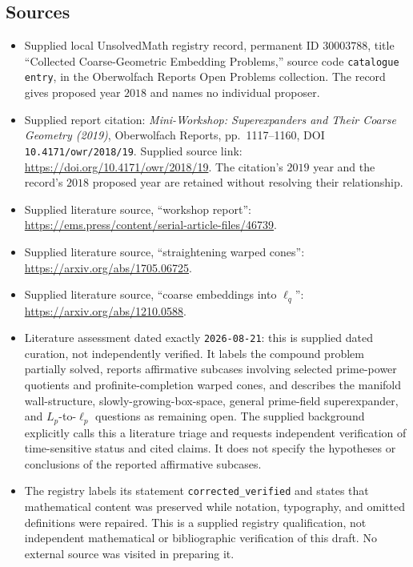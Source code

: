 \documentclass[11pt]{article}
\begin{document}
\subsection{Sources}
\begin{itemize}
\item Supplied local UnsolvedMath registry record, permanent ID \(30003788\), title ``Collected Coarse-Geometric Embedding Problems,'' source code \texttt{catalogue entry}, in the Oberwolfach Reports Open Problems collection. The record gives proposed year \(2018\) and names no individual proposer.
\item Supplied report citation: \emph{Mini-Workshop: Superexpanders and Their Coarse Geometry (2019)}, Oberwolfach Reports, pp.\ 1117--1160, DOI \texttt{10.4171/owr/2018/19}. Supplied source link: \url{https://doi.org/10.4171/owr/2018/19}. The citation's \(2019\) year and the record's \(2018\) proposed year are retained without resolving their relationship.
\item Supplied literature source, ``workshop report'': \url{https://ems.press/content/serial-article-files/46739}.
\item Supplied literature source, ``straightening warped cones'': \url{https://arxiv.org/abs/1705.06725}.
\item Supplied literature source, ``coarse embeddings into \(\ell_q\)'': \url{https://arxiv.org/abs/1210.0588}.
\item Literature assessment dated exactly \texttt{2026-08-21}: this is supplied dated curation, not independently verified. It labels the compound problem partially solved, reports affirmative subcases involving selected prime-power quotients and profinite-completion warped cones, and describes the manifold wall-structure, slowly-growing-box-space, general prime-field superexpander, and \(L_p\)-to-\(\ell_p\) questions as remaining open. The supplied background explicitly calls this a literature triage and requests independent verification of time-sensitive status and cited claims. It does not specify the hypotheses or conclusions of the reported affirmative subcases.
\item The registry labels its statement \texttt{corrected\_verified} and states that mathematical content was preserved while notation, typography, and omitted definitions were repaired. This is a supplied registry qualification, not independent mathematical or bibliographic verification of this draft. No external source was visited in preparing it.
\end{itemize}
\end{document}
